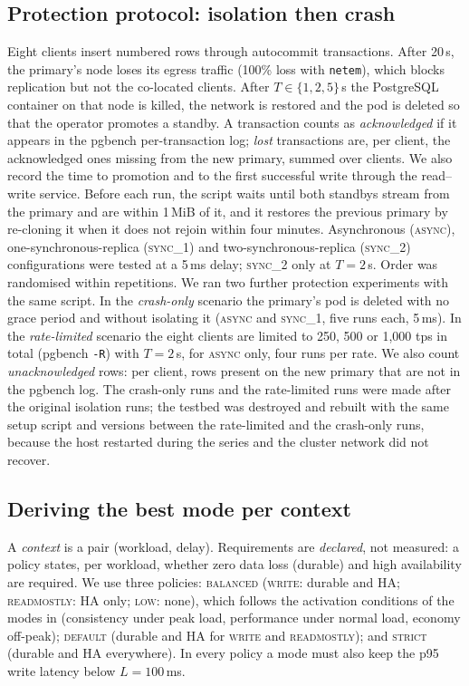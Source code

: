 \documentclass[preprint,12pt]{elsarticle}
\begin{document}
\subsection{Protection protocol: isolation then crash}\label{sec:rpoproto}
Eight clients insert numbered rows through autocommit transactions. After 20\,s, the primary's node loses its egress traffic (100\% loss with \texttt{netem}), which blocks replication but not the co-located clients. After $T\in\{1,2,5\}$\,s the PostgreSQL container on that node is killed, the network is restored and the pod is deleted so that the operator promotes a standby. A transaction counts as \emph{acknowledged} if it appears in the pgbench per-transaction log; \emph{lost} transactions are, per client, the acknowledged ones missing from the new primary, summed over clients. We also record the time to promotion and to the first successful write through the read--write service. Before each run, the script waits until both standbys stream from the primary and are within 1\,MiB of it, and it restores the previous primary by re-cloning it when it does not rejoin within four minutes. Asynchronous (\textsc{async}), one-synchronous-replica (\textsc{sync\_1}) and two-synchronous-replica (\textsc{sync\_2}) configurations were tested at a 5\,ms delay; \textsc{sync\_2} only at $T=2$\,s. Order was randomised within repetitions. We ran two further protection experiments with the same script. In the \emph{crash-only} scenario the primary's pod is deleted with no grace period and without isolating it (\textsc{async} and \textsc{sync\_1}, five runs each, 5\,ms). In the \emph{rate-limited} scenario the eight clients are limited to 250, 500 or 1,000 tps in total (pgbench \texttt{-R}) with $T=2$\,s, for \textsc{async} only, four runs per rate. We also count \emph{unacknowledged} rows: per client, rows present on the new primary that are not in the pgbench log. The crash-only runs and the rate-limited runs were made after the original isolation runs; the testbed was destroyed and rebuilt with the same setup script and versions between the rate-limited and the crash-only runs, because the host restarted during the series and the cluster network did not recover.

\subsection{Deriving the best mode per context}\label{sec:labels}
A \emph{context} is a pair (workload, delay). Requirements are \emph{declared}, not measured: a policy states, per workload, whether zero data loss (durable) and high availability are required. We use three policies: \textsc{balanced} (\textsc{write}: durable and HA; \textsc{readmostly}: HA only; \textsc{low}: none), which follows the activation conditions of the modes in \cite{jerrari2026iaha} (consistency under peak load, performance under normal load, economy off-peak); \textsc{default} (durable and HA for \textsc{write} and \textsc{readmostly}); and \textsc{strict} (durable and HA everywhere). In every policy a mode must also keep the p95 write latency below $L=100$\,ms.
\end{document}

